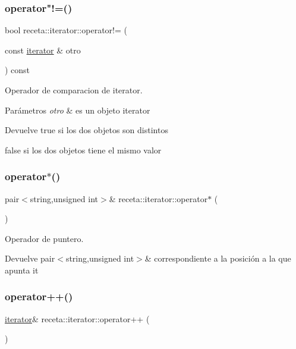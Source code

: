 \subsubsection{\texorpdfstring{operator"!=()}{operator!=()}}
{\footnotesize\ttfamily bool receta\+::iterator\+::operator!= (\begin{DoxyParamCaption}\item[{const \hyperlink{classreceta_1_1iterator}{iterator} \&}]{otro }\end{DoxyParamCaption}) const}



Operador de comparacion de iterator. 


\begin{DoxyParams}{Parámetros}
{\em otro} & es un objeto iterator \\
\hline
\end{DoxyParams}
\begin{DoxyReturn}{Devuelve}
true si los dos objetos son distintos 

false si los dos objetos tiene el mismo valor 
\end{DoxyReturn}
\mbox{\label{classreceta_1_1iterator_ab73e660fecde193949ccd9c509766f72}} 
\subsubsection{\texorpdfstring{operator$\ast$()}{operator*()}}
{\footnotesize\ttfamily pair$<$string,unsigned int$>$\& receta\+::iterator\+::operator$\ast$ (\begin{DoxyParamCaption}{ }\end{DoxyParamCaption})}



Operador de puntero. 

\begin{DoxyReturn}{Devuelve}
pair$<$string,unsigned int$>$\& correspondiente a la posición a la que apunta it 
\end{DoxyReturn}
\mbox{\label{classreceta_1_1iterator_a24fb45c8140074c203a5e08aa74a44f4}} 
\subsubsection{\texorpdfstring{operator++()}{operator++()}}
{\footnotesize\ttfamily \hyperlink{classreceta_1_1iterator}{iterator}\& receta\+::iterator\+::operator++ (\begin{DoxyParamCaption}{ }\end{DoxyParamCaption})}



